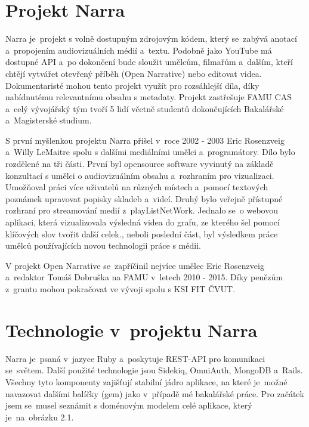\section{Projekt Narra}
\par Narra je~projekt s volně dostupným zdrojovým kódem, který se~zabývá anotací a~propojením audiovizuálních médií a~textu. Podobně jako YouTube má dostupné API a~po dokončení bude sloužit umělcům, filmařům a~dalším, kteří chtějí vytvářet otevřený příběh (Open Narrative) nebo editovat videa. Dokumentaristé mohou tento projekt využít pro rozsáhlejší díla, díky nabídnutému relevantnímu obsahu s metadaty. Projekt zastřešuje FAMU CAS a~celý vývojářský tým tvoří 5 lidí včetně studentů dokončujících Bakalářské a~Magisterské studium.
\par S první myšlenkou projektu Narra přišel v~roce 2002 - 2003 Eric Rosenzveig a~Willy LeMaitre spolu s dalšími mediálními umělci a~programátory. Dílo bylo rozdělené na tři části. První byl opensource software vyvinutý na základě konzultací s umělci o audiovizuálním obsahu a~rozhraním pro vizualizaci. Umožňoval práci více uživatelů na různých místech a~pomocí textových poznámek upravovat popisky skladeb a~videí. Druhý bylo veřejně přístupné rozhraní pro streamování medií z~playListNetWork. Jednalo se~o webovou aplikaci, která vizualizovala výsledná videa do grafu, ze kterého šel pomocí klíčových slov tvořit další celek., neboli poslední část, byl výsledkem práce umělců používajících novou technologii práce s médii.
\par V projekt Open Narrative se~zapříčinil nejvíce umělec Eric Rosenzveig a~redaktor Tomáš Dobruška na FAMU v~letech 2010 - 2015. Díky penězům z~grantu mohou pokračovat ve vývoji spolu s KSI FIT ČVUT.

\section{Technologie v~projektu Narra} 
\par Narra je~psaná v~jazyce Ruby a~poskytuje REST-API pro komunikaci se~světem. Další použité technologie jsou Sidekiq, OmniAuth, MongoDB a~Rails. Všechny tyto komponenty zajišťují stabilní jádro aplikace, na které je~možné navazovat dalšími balíčky (gem) jako v~případě mé bakalářské práce. Pro začátek jsem se~musel seznámit s doménovým modelem celé aplikace, který je~na~obrázku 2.1.


